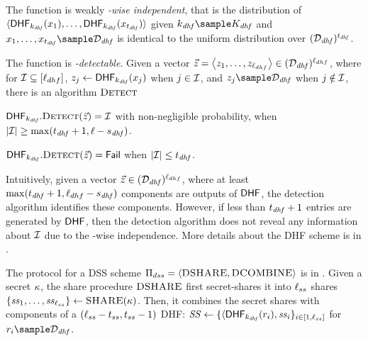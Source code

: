 \enumListStart
\item The function is weakly \textit{\dhfParamMatchThreshold-wise
  independent}, that is the distribution of
  $\langle\dhf[\dhfKey](\genericFnInput[1]), \dots,
  \dhf[\dhfKey](\genericFnInput[\dhfParamMatchThreshold])\rangle$
  given $\dhfKey \getsr \dhfKeySpace$ and $\genericFnInput[1], \dots,
  \genericFnInput[\dhfParamMatchThreshold] \getsr \dhfDomain$ is
  identical to the uniform distribution over
  $(\mathcal{D}_{\mathit{dhf}})^{t_{\mathit{dhf}}}$.
	
\item The function is \textit{\dhfParamRandThreshold-detectable}. 
  Given a vector $\genericVec = \tupleDefn{\genericVec[1], \dots, 
    \genericVec[\dhfLength]} \in (\dhfDomain)^{\dhfLength}$, where for $\matchedIndexSet 
  \subseteq \nats[\dhfLength]$, $\genericVec[\projIdx] \gets 
  \dhf[\dhfKey](\genericFnInput[\projIdx])$ when $\projIdx \in \matchedIndexSet$, 
  and $\genericVec[\projIdx] \getsr \dhfDomain$ when $\projIdx \notin \matchedIndexSet$, 
  there is an algorithm $\textsc{Detect}$   
	\itemListStart
  \item $\dhf[\dhfKey].\dhfDetect(\genericVec) =
    \matchedIndexSet$ with non-negligible probability,
    when $\setSize{\matchedIndexSet} \ge
    \max(\dhfParamMatchThreshold+1, \genericVecLen -
    \dhfParamRandThreshold)$.
  \item $\dhf[\dhfKey].\dhfDetect(\genericVec) =
    \dhfFail$ when $\setSize{\matchedIndexSet} \le
    \dhfParamMatchThreshold$.
\itemListEnd
\enumListEnd
  

  Intuitively, given a vector $\genericVec \in
  (\dhfDomain)^{\dhfLength}$, where at least
  $\max(t_{\mathit{dhf}}+1, \ell_{dhf} - s_{\mathit{dhf}})$ 
  components are outputs of $\dhf$,
  the detection algorithm identifies these components. However,
  if less than $t_{\mathit{dhf}}+1$ entries are generated
  by $\dhf$, then the detection algorithm does not reveal any
  information about $\matchedIndexSet$ due to the \dhfParamMatchThreshold-wise independence. More details about the DHF scheme is in . 


The protocol for a DSS scheme $\Pi_{dss} = \langle \textsc{DSHARE}, \textsc{DCOMBINE} \rangle$ is in . Given a secret $\kappa$, the share procedure $\textsc{DSHARE}$ first secret-shares it into $\ell_{ss}$ shares $\{\mathit{ss}_{1}, \dots, \mathit{ss}_{\ell_{ss}} \}  \gets \textsc{SHARE}(\kappa)$. Then, it combines the secret shares with \secretShareLength components of a $(\ell_{ss} - t_{ss}, t_{ss} - 1)$ DHF: $\ssSet \assign  \{\langle \dhf[\dhfKey](\genericRand_{\setIdx}), \secretShare{\setIdx} \}_{\setIdx \in [1, \secretShareLength]}$ for $\genericRand_{\setIdx} \sample \dhfDomain$.

